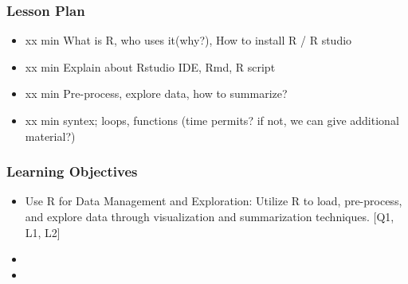 

\begin{frame}
\frametitle{Lesson Plan}
\begin{itemize}
    \item xx min What is R, who uses it(why?), How to install R / R studio
    \item xx min Explain about Rstudio IDE, Rmd, R script 
    \item xx min Pre-process, explore data, how to summarize? 
    \item xx min syntex; loops, functions (time permits? if not, we can give additional material?)
\end{itemize}
\end{frame}


\begin{frame}
\frametitle{Learning Objectives}

\begin{itemize}
    \item Use R for Data Management and Exploration: Utilize R to load, pre-process, and explore data through visualization and summarization techniques. [Q1, L1, L2]
    \item 
    \item 
\end{itemize}
\end{frame}





